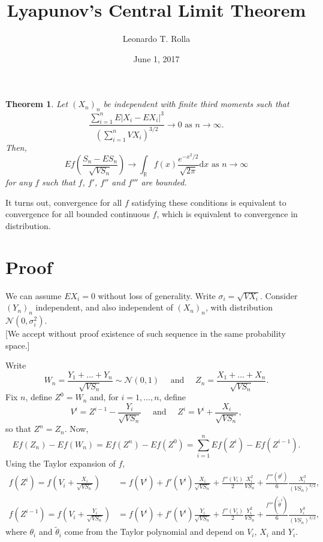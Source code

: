 \documentclass[a4paper,12pt]{article}
\newtheorem{theorem}[equation]{Theorem}
\theoremstyle{definition}
\newcommand{\dd}{\mathrm{d}}
\newcommand{\R}{\mathbb{R}}
\begin{document}
\title{Lyapunov's Central Limit Theorem}
\author{Leonardo T. Rolla}
\date{June 1, 2017}
\maketitle

{\let\thefootnote\relax
{}}

\begin{theorem}
Let $(X_n)_n$ be independent with finite third moments such that
\[
\frac{\sum_{i=1}^{n} E|X_i-EX_i|^3}{\left( \sum_{i=1}^{n} VX_i \right)^{3/2}} \to 0
\text{ as }
n\to \infty
.
\]
Then,
\[
E f\left( \frac{S_n-ES_n}{\sqrt{VS_n}} \right) \to \int_\R f(x) \frac{e^{-x^2/2}}{\sqrt{2\pi}} \dd x
\text{ as }
n\to \infty
\]
for any $f$ such that $f$, $f'$, $f''$ and $f'''$ are bounded.
\end{theorem}

It turns out, convergence for all $f$ satisfying these conditions is equivalent to convergence for all bounded continuous $f$, which is equivalent to convergence in distribution.

\section*{Proof}

We can assume $EX_i=0$ without loss of generality.
Write $\sigma_i = \sqrt{VX_i}$.
Consider $(Y_n)_n$ independent, and also independent of $(X_n)_n$, with distribution $\mathcal{N}(0,\sigma_i^2)$.
\\{}
[We accept without proof existence of such sequence in the same probability space.]

Write
\[
W_n
=
\frac{Y_1+\dots+Y_n}{\sqrt{VS_n}}
\sim
\mathcal{N}(0,1)
\quad
\text{ and }
\quad
Z_n
=
\frac{X_1+\dots+X_n}{\sqrt{VS_n}}
.
\]
Fix $n$, define $Z^0 = W_n$ and, for $i=1,\dots,n$, define
\[
V^i = Z^{i-1} - \frac{Y_i}{\sqrt{VS_n}}
\quad
\text{ and }
\quad
Z^i = V^{i} + \frac{X_i}{\sqrt{VS_n}},
\]
so that $Z^n = Z_n$.
Now,
\[
Ef(Z_n) - Ef(W_n)
=
Ef(Z^n) - Ef(Z^0)
=
\sum_{i=1}^n
Ef(Z^i)-Ef(Z^{i-1})
.
\]
Using the Taylor expansion of $f$,
\begin{align*}
f(Z^i)
=
f(V_i+\frac{X_i}{\sqrt{VS_n}})
& =
f(V^i) + f'(V^i) \frac{X_i}{\sqrt{VS_n}} + \frac{f''(V_i)}{2}\frac{X_i^2}{{VS_n}} + \frac{f'''(\theta^i)}{6}\frac{X_i^3}{(VS_n)^{3/2}}
,
\\
f(Z^{i-1})
=
f(V_i+\frac{Y_i}{\sqrt{VS_n}})
& =
f(V^i) + f'(V^i) \frac{Y_i}{\sqrt{VS_n}} + \frac{f''(V_i)}{2}\frac{Y_i^2}{{VS_n}} + \frac{f'''(\tilde\theta^i)}{6}\frac{Y_i^3}{(VS_n)^{3/2}}
,
\end{align*}
where $\theta_i$ and $\tilde\theta_i$ come from the Taylor polynomial and depend on $V_i$, $X_i$ and $Y_i$.
\end{document}
